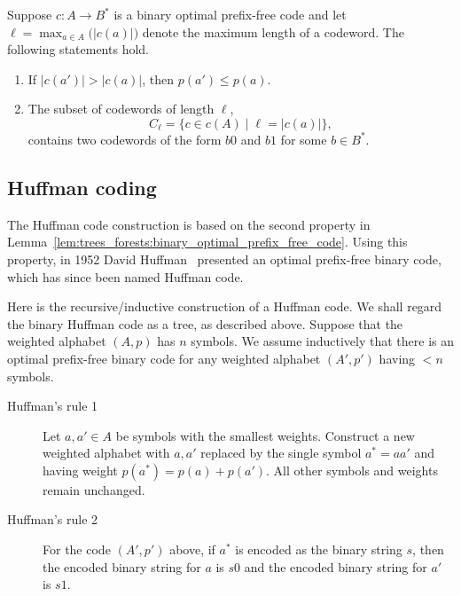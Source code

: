 \begin{lemma}
\label{lem:trees_forests:binary_optimal_prefix_free_code}
Suppose $c: A \to B^*$ is a binary optimal prefix-free
code and let $\ell = \max_{a \in A} \big(|c(a)|\big)$ denote the
maximum length of a codeword. The following statements hold.
%
\begin{enumerate}
\item If $|c(a')|>|c(a)|$, then $p(a')\leq p(a)$.

\item The subset of codewords of length $\ell$,
\[
C_\ell
=
\{c \in c(A) \;|\; \ell = |c(a)|\},
\]
contains two codewords of the form $b0$ and $b1$ for some $b \in B^*$.
\end{enumerate}
\end{lemma}



\subsection{Huffman coding}

The Huffman code construction is based on the second property in
Lemma~\ref{lem:trees_forests:binary_optimal_prefix_free_code}. Using
this property, in 1952 David Huffman~\cite{Huffman1952} presented an
optimal prefix-free binary code, which has since been named Huffman
code.

Here is the recursive/inductive construction of a Huffman code. We
shall regard the binary Huffman code as a tree, as described
above. Suppose that the weighted alphabet $(A,p)$ has $n$ symbols. We
assume inductively that there is an optimal prefix-free binary code
for any weighted alphabet $(A',p')$ having $<n$ symbols.

\begin{description}
\item[Huffman's rule 1] Let $a,a' \in A$ be symbols with the smallest
  weights. Construct a new weighted alphabet with $a,a'$ replaced by
  the single symbol $a^* = aa'$ and having weight
  $p(a^*) = p(a) + p(a')$. All other symbols and weights remain
  unchanged.

\item[Huffman's rule 2] For the code $(A',p')$ above, if $a^*$ is
  encoded as the binary string $s$, then the encoded binary string for
  $a$ is $s0$ and the encoded binary string for $a'$ is $s1$.
\end{description}

